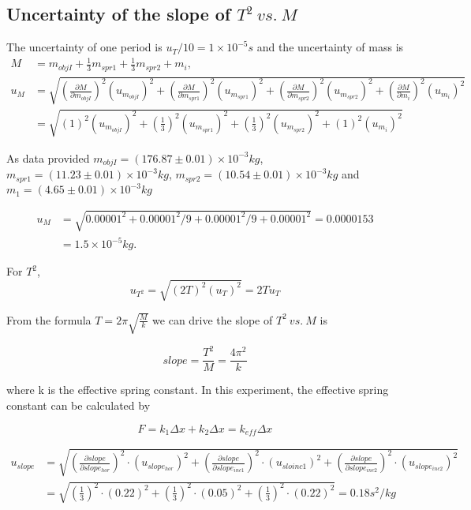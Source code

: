 \subsection{Uncertainty of the slope of $T^2\ vs.\ M$}
The uncertainty of one period is $u_T/10=1\times10^{-5}s$ and the uncertainty of mass is
\[
\begin{split}
    M&=m_{objI}+\frac{1}{3}m_{spr1}+\frac{1}{3}m_{spr2}+m_i,\\
    u_M&=\sqrt{
     (\frac{\partial M}{\partial m_{objI}})^2(u_{m_{objI}})^2
    +(\frac{\partial M}{\partial m_{spr1}})^2(u_{m_{spr1}})^2
    +(\frac{\partial M}{\partial m_{spr2}})^2(u_{m_{spr2}})^2
    +(\frac{\partial M}{\partial m_i})^2(u_{m_i})^2
    }\\
    &=\sqrt{
     (1)^2(u_{m_{objI}})^2
    +(\frac{1}{3})^2(u_{m_{spr1}})^2
    +(\frac{1}{3})^2(u_{m_{spr2}})^2
    +(1)^2(u_{m_i})^2
    }
\end{split}
\]

As data provided 
$m_{objI}=(176.87\pm0.01)\times10^{-3}kg$, $m_{spr1}=(11.23\pm0.01)\times10^{-3}kg$, $m_{spr2}=(10.54\pm0.01)\times10^{-3}kg$ and $m_1=(4.65\pm0.01)\times10^{-3}kg$

\[
\begin{split}
    u_M & = \sqrt{0.00001^2+0.00001^2/9+0.00001^2/9+0.00001^2}=0.0000153\\
        & = 1.5\times10^{-5}kg.
\end{split}
\]

For $T^2$,
$$   u_{T^2}=\sqrt{(2T)^2(u_T)^2}=2Tu_T$$

From the formula $T=2\pi\sqrt{\frac{M}{k}}$ 
we can drive the slope of $T^2\ vs.\ M$ is

$$	slope=\frac{T^2}{M}=\frac{4\pi^2}{k}$$

where k is the effective spring constant. In this experiment, the effective spring constant can be calculated by

$$  F =k_1\Delta x+k_2\Delta x  =k_{eff}\Delta x   $$


\[
\begin{split}
u_{slope} & = \sqrt{
	(\frac{\partial slope}{\partial slope_{hor}})^2\cdot(u_{slope_{hor}})^2
	+(\frac{\partial slope}{\partial slope_{inc1}})^2\cdot(u_{sloinc1})^2
	+(\frac{\partial slope}{\partial slope_{inc2}})^2\cdot(u_{slope_{inc2}})^2} \\
& = \sqrt{
	(\frac{1}{3})^2 \cdot (0.22)^2
	+(\frac{1}{3})^2 \cdot (0.05)^2
	+(\frac{1}{3})^2 \cdot (0.22)^2} = 0.18s^2/kg\\
\end{split}
\]


